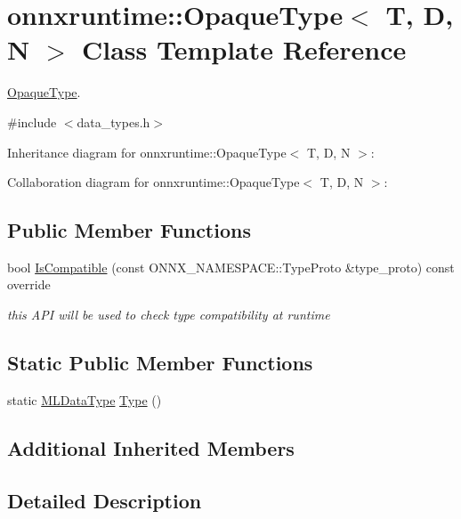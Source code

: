 \hypertarget{classonnxruntime_1_1OpaqueType}{}\section{onnxruntime\+:\+:Opaque\+Type$<$ T, D, N $>$ Class Template Reference}
\label{classonnxruntime_1_1OpaqueType}


\mbox{\hyperlink{classonnxruntime_1_1OpaqueType}{Opaque\+Type}}.  




{\ttfamily \#include $<$data\+\_\+types.\+h$>$}



Inheritance diagram for onnxruntime\+:\+:Opaque\+Type$<$ T, D, N $>$\+:


Collaboration diagram for onnxruntime\+:\+:Opaque\+Type$<$ T, D, N $>$\+:
\subsection*{Public Member Functions}
\begin{DoxyCompactItemize}
\item 
bool \mbox{\hyperlink{classonnxruntime_1_1OpaqueType_a86b093877581257e6692e3028ebec5e5}{Is\+Compatible}} (const O\+N\+N\+X\+\_\+\+N\+A\+M\+E\+S\+P\+A\+C\+E\+::\+Type\+Proto \&type\+\_\+proto) const override
\begin{DoxyCompactList}\small\item\em this A\+PI will be used to check type compatibility at runtime \end{DoxyCompactList}\end{DoxyCompactItemize}
\subsection*{Static Public Member Functions}
\begin{DoxyCompactItemize}
\item 
static \mbox{\hyperlink{namespaceonnxruntime_ad77d0a6e838ec7da5dc35fed5ee66b49}{M\+L\+Data\+Type}} \mbox{\hyperlink{classonnxruntime_1_1OpaqueType_aa3c7c495b0e75472262f7ee2e4b72018}{Type}} ()
\end{DoxyCompactItemize}
\subsection*{Additional Inherited Members}


\subsection{Detailed Description}
